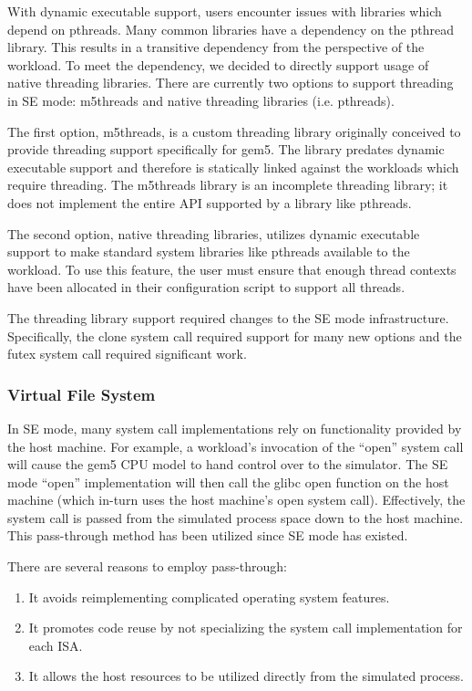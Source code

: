 With dynamic executable support, users encounter issues with libraries which depend on pthreads.
Many common libraries have a dependency on the pthread library.
This results in a transitive dependency from the perspective of the workload.
To meet the dependency, we decided to directly support usage of native threading libraries.
There are currently two options to support threading in SE mode: m5threads and native threading libraries (i.e. pthreads).

The first option, m5threads, is a custom threading library originally conceived to provide threading support specifically for gem5.
The library predates dynamic executable support and therefore is statically linked against the workloads which require threading.
The m5threads library is an incomplete threading library; it does not implement the entire API supported by a library like pthreads.

The second option, native threading libraries, utilizes dynamic executable support to make standard system libraries like pthreads available to the workload.
To use this feature, the user must ensure that enough thread contexts have been allocated in their configuration script to support all threads.

The threading library support required changes to the SE mode infrastructure.
Specifically, the clone system call required support for many new options and the futex system call required significant work.

\subsubsection{Virtual File System}
\label{sec:vfs}

In SE mode, many system call implementations rely on functionality provided by the host machine.
For example, a workload's invocation of the ``open'' system call will cause the gem5 CPU model to hand control over to the simulator.
The SE mode ``open'' implementation will then call the glibc open function on the host machine (which in-turn uses the host machine’s open system call).
Effectively, the system call is passed from the simulated process space down to the host machine.
This pass-through method has been utilized since SE mode has existed.

There are several reasons to employ pass-through:
\begin{enumerate}
    \item It avoids reimplementing complicated operating system features.
    \item It promotes code reuse by not specializing the system call implementation for each ISA.
    \item It allows the host resources to be utilized directly from the simulated process.
\end{enumerate}

